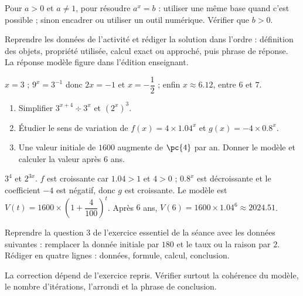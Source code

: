 \begin{summary}Pour $a>0$ et $a\neq1$, pour résoudre $a^x=b$ : utiliser une même base quand c'est possible ; sinon encadrer ou utiliser un outil numérique. Vérifier que $b>0$.\end{summary}

\begin{example}
Reprendre les données de l'activité et rédiger la solution dans l'ordre : définition des objets, propriété utilisée, calcul exact ou approché, puis phrase de réponse. La réponse modèle figure dans l'édition enseignant.
\end{example}
\begin{solution}$x=3$ ; $9^x=3^{-1}$ donc $2x=-1$ et $x=-\dfrac12$ ; enfin $x\approx\num{6,12}$, entre $6$ et $7$.\end{solution}

\begin{exercise}[essentiel]
\begin{enumerate}\item Simplifier $3^{x+4}\div3^x$ et $(2^x)^3$.\item Étudier le sens de variation de $f(x)=4\times\num{1,04}^x$ et $g(x)=-4\times\num{0,8}^x$.\item Une valeur initiale de $1600$ augmente de $\pc{4}$ par an. Donner le modèle et calculer la valeur après $6$ ans.\end{enumerate}
\end{exercise}
\begin{solution}$3^4$ et $2^{3x}$. $f$ est croissante car $\num{1,04}>1$ et $4>0$ ; $\num{0,8}^x$ est décroissante et le coefficient $-4$ est négatif, donc $g$ est croissante. Le modèle est $V(t)=1600\times\left(1+\dfrac{4}{100}\right)^t$. Après $6$ ans, $V(6)=1600\times\num{1,04}^6\approx\num{2024,51}$.\end{solution}


\begin{homework}Reprendre la question 3 de l'exercice essentiel de la séance avec les données suivantes : remplacer la donnée initiale par $180$ et le taux ou la raison par $2$. Rédiger en quatre lignes : données, formule, calcul, conclusion.\end{homework}
\begin{solution}La correction dépend de l'exercice repris. Vérifier surtout la cohérence du modèle, le nombre d'itérations, l'arrondi et la phrase de conclusion.\end{solution}

